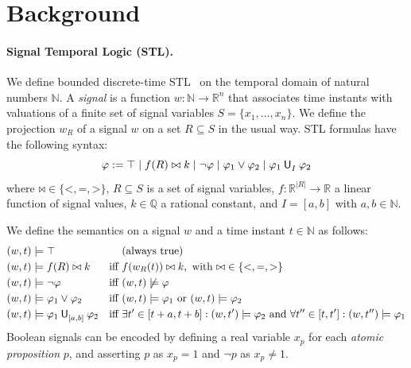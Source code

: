 \documentclass{easychair}
\begin{document}


\section{Background}
\label{sec:background}

\paragraph{Signal Temporal Logic (STL).}
We define bounded discrete-time STL~\cite{MalerN04} on the temporal domain of natural numbers $\mathbb{N}$.
A \emph{signal} is a function $w : \mathbb{N} \rightarrow \mathbb{R}^n$
that associates time instants with valuations of a finite set of signal variables $S = \{ x_1, \dots, x_n \}$.
We define the projection $w_R$ of a signal $w$ on a set $R \subseteq S$ in the usual way.
%
STL formulas have the following syntax:
\[
\varphi := \top \mid f(R) \bowtie k \mid \neg \varphi \mid \varphi_1 \lor \varphi_2
  \mid \until{I}{\varphi_1}{\varphi_2}
\]
where $\mathord{\bowtie} \in \{\mathord{<}, \mathord{=}, \mathord{>}\}$,
$R \subseteq S$ is a set of signal variables,
$f : \mathbb{R}^{|R|} \rightarrow \mathbb{R}$ a linear function of signal values,
$k \in \mathbb{Q}$ a rational constant,
and $I = [a,b]$ with $a, b \in \mathbb{N}$.

We define the semantics on a signal $w$ and a time instant $t \in \mathbb{N}$ as follows:
\begin{align*}
    &(w,t) \models \top && \text{(always true)} \\
    &(w,t) \models f(R) \bowtie k     & \text{iff } & f(w_R(t)) \bowtie k, \text{ with } \mathord{\bowtie} \in \{\mathord{<}, \mathord{=}, \mathord{>}\} \\
    &(w,t) \models \neg \varphi & \text{iff } & (w,t) \not\models  \varphi \\
    &(w,t) \models \varphi_1 \lor \varphi_2 & \text{iff } & (w,t) \models \varphi_1 \text{ or } (w,t) \models \varphi_2 \\
    &(w,t) \models \until{[a,b]}{\varphi_1}{\varphi_2}  & \text{iff } &
    \exists t' \in [t+a, t+b] : (w, t') \models \varphi_2
    \text{ and } \forall t'' \in [t, t'] : (w,t'') \models \varphi_1
\end{align*}
Boolean signals can be encoded by defining a real variable $x_p$
for each \emph{atomic proposition} $p$, and asserting $p$ as $x_p = 1$ and $\neg p$ as $x_p \neq 1$.
\end{document}
